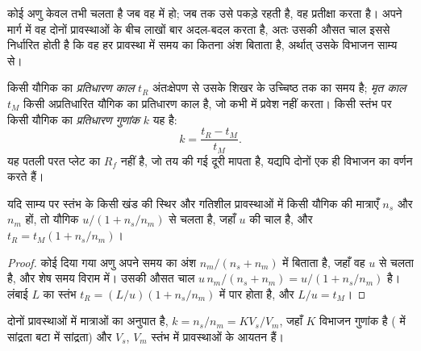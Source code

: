 कोई अणु केवल तभी चलता है जब वह  में हो; जब तक  उसे पकड़े रहती है, वह
प्रतीक्षा करता है। अपने मार्ग में वह दोनों प्रावस्थाओं के बीच लाखों बार अदल-बदल करता है, अतः उसकी औसत चाल
इससे निर्धारित होती है कि वह हर प्रावस्था में समय का कितना अंश बिताता है, अर्थात् उसके विभाजन साम्य से।

\begin{definition}[प्रतिधारण]\label{def:b2:chromatography:retention}
किसी यौगिक का \emph{प्रतिधारण काल} $t_R$ अंतःक्षेपण से उसके शिखर के
उच्चिष्ठ तक का समय है; \emph{मृत काल} $t_M$ किसी
अप्रतिधारित यौगिक का प्रतिधारण काल है, जो कभी  में प्रवेश नहीं करता। किसी स्तंभ पर किसी यौगिक का
\emph{प्रतिधारण गुणांक}
$k$ यह है:
\begin{equation*}
k = \frac{t_R - t_M}{t_M}.
\end{equation*}
यह पतली परत प्लेट का $R_f$ नहीं है, जो तय की गई दूरी मापता है, यद्यपि दोनों एक ही
विभाजन का वर्णन करते हैं।
\end{definition}

\begin{proposition}[प्रतिधारण काल]\label{prop:b2:chromatography:retention-time}
यदि साम्य पर स्तंभ के किसी खंड की स्थिर और गतिशील प्रावस्थाओं में किसी यौगिक की मात्राएँ
$n_s$ और $n_m$ हों, तो यौगिक $u/(1 + n_s/n_m)$ से चलता है, जहाँ $u$  की चाल है,
और $t_R = t_M(1 + n_s/n_m)$।
\end{proposition}

\begin{proof}
कोई दिया गया अणु अपने समय का अंश $n_m/(n_s + n_m)$  में बिताता है, जहाँ वह
$u$ से चलता है, और शेष समय विराम में। उसकी औसत चाल $u\,n_m/(n_s + n_m) = u/(1 + n_s/n_m)$ है। लंबाई
$L$ का स्तंभ $t_R = (L/u)(1 + n_s/n_m)$ में पार होता है, और $L/u = t_M$।
\end{proof}

\begin{proposition}[प्रतिधारण और विभाजन]\label{prop:b2:chromatography:k-and-K}
 दोनों प्रावस्थाओं में मात्राओं का अनुपात है, $k = n_s/n_m = KV_s/V_m$, जहाँ $K$
विभाजन गुणांक है ( में सांद्रता बटा  में सांद्रता) और $V_s$, $V_m$ स्तंभ में प्रावस्थाओं के आयतन हैं।
\end{proposition}

